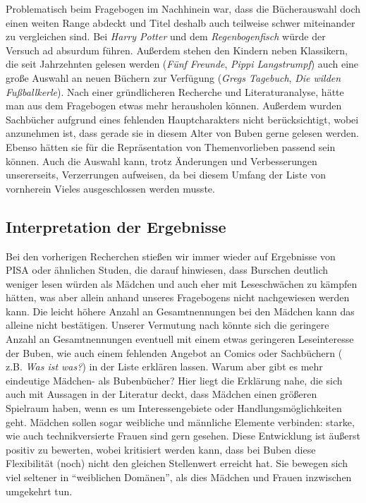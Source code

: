 

Problematisch beim Fragebogen im Nachhinein war, dass die Bücherauswahl
doch einen weiten Range abdeckt und Titel deshalb auch teilweise schwer
miteinander zu vergleichen sind. Bei \emph{Harry Potter} und dem
\emph{Regenbogenfisch} würde der Versuch ad absurdum führen. Außerdem
stehen den Kindern neben Klassikern, die seit Jahrzehnten gelesen werden
(\emph{Fünf Freunde}, \emph{Pippi Langstrumpf}) auch eine große Auswahl
an neuen Büchern zur Verfügung (\emph{Gregs Tagebuch}, \emph{Die wilden
Fußballkerle}). Nach einer gründlicheren Recherche und Literaturanalyse,
hätte man aus dem Fragebogen etwas mehr herausholen können. Außerdem
wurden Sachbücher aufgrund eines fehlenden Hauptcharakters nicht
berücksichtigt, wobei anzunehmen ist, dass gerade sie in diesem Alter
von Buben gerne gelesen werden. Ebenso hätten sie für die Repräsentation
von Themenvorlieben passend sein können. Auch die Auswahl kann, trotz
Änderungen und Verbesserungen unsererseits, Verzerrungen aufweisen, da
bei diesem Umfang der Liste von vornherein Vieles ausgeschlossen werden
musste.



\subsection{Interpretation der Ergebnisse}

Bei den vorherigen Recherchen stießen wir immer wieder auf Ergebnisse
von PISA oder ähnlichen Studen, die darauf hinwiesen, dass Burschen
deutlich weniger lesen würden als Mädchen und auch eher mit
Leseschwächen zu kämpfen hätten, was aber allein anhand unseres
Fragebogens nicht nachgewiesen werden kann. Die leicht höhere Anzahl an
Gesamtnennungen bei den Mädchen kann das alleine nicht bestätigen.
Unserer Vermutung nach könnte sich die geringere Anzahl an
Gesamtnennungen eventuell mit einem etwas geringeren Leseinteresse der
Buben, wie auch einem fehlenden Angebot an Comics oder Sachbüchern (
z.B. \emph{Was ist was?}) in der Liste erklären lassen. Warum aber gibt
es mehr eindeutige Mädchen- als Bubenbücher? Hier liegt die Erklärung
nahe, die sich auch mit Aussagen in der Literatur deckt, dass Mädchen
einen größeren Spielraum haben, wenn es um Interessengebiete oder
Handlungsmöglichkeiten geht. Mädchen sollen sogar weibliche und
männliche Elemente verbinden: starke, wie auch technikversierte Frauen
sind gern gesehen. Diese Entwicklung ist äußerst positiv zu bewerten,
wobei kritisiert werden kann, dass bei Buben diese Flexibilität (noch)
nicht den gleichen Stellenwert erreicht hat. Sie bewegen sich viel
seltener in ``weiblichen Domänen'', als dies Mädchen und Frauen
inzwischen umgekehrt tun.

